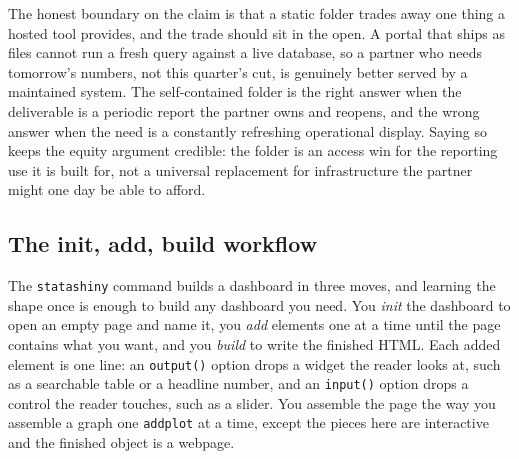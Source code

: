 The honest boundary on the claim is that a static folder trades away one thing a hosted tool provides, and the trade should sit in the open. A portal that ships as files cannot run a fresh query against a live database, so a partner who needs tomorrow's numbers, not this quarter's cut, is genuinely better served by a maintained system. The self-contained folder is the right answer when the deliverable is a periodic report the partner owns and reopens, and the wrong answer when the need is a constantly refreshing operational display. Saying so keeps the equity argument credible: the folder is an access win for the reporting use it is built for, not a universal replacement for infrastructure the partner might one day be able to afford.

\subsection{The init, add, build workflow}
The \texttt{statashiny} command builds a dashboard in three moves, and learning the shape once is enough to build any dashboard you need. You \emph{init} the dashboard to open an empty page and name it, you \emph{add} elements one at a time until the page contains what you want, and you \emph{build} to write the finished HTML. Each added element is one line: an \texttt{output()} option drops a widget the reader looks at, such as a searchable table or a headline number, and an \texttt{input()} option drops a control the reader touches, such as a slider. You assemble the page the way you assemble a graph one \texttt{addplot} at a time, except the pieces here are interactive and the finished object is a webpage.

